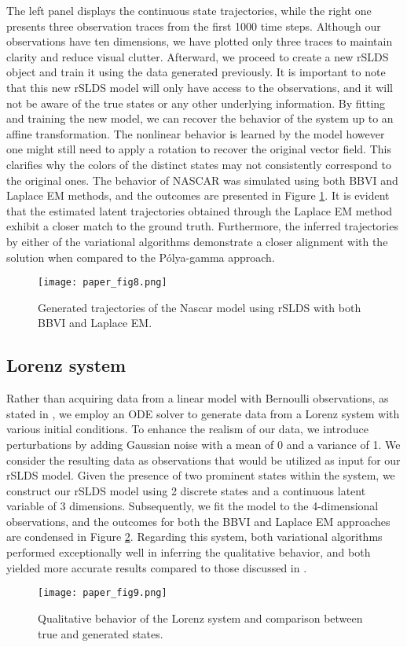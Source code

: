 The left panel displays the continuous state trajectories, while the right one presents three observation traces from the first 1000 time steps. Although our observations have ten dimensions, we have plotted only three traces to maintain clarity and reduce visual clutter. Afterward, we proceed to create a new rSLDS object and train it using the data generated previously. It is important to note that this new rSLDS model will only have access to the observations, and it will not be aware of the true states or any other underlying information. By fitting and training the new model, we can recover the behavior of the system up to an affine transformation. The nonlinear behavior is learned by the model however one might still need to apply a rotation to recover the original vector field. This clarifies why the colors of the distinct states may not consistently correspond to the original ones. The behavior of NASCAR was simulated using both BBVI and Laplace EM methods, and the outcomes are presented in Figure \ref{generatedNascar}. It is evident that the estimated latent trajectories obtained through the Laplace EM method exhibit a closer match to the ground truth. Furthermore, the inferred trajectories by either of the variational algorithms demonstrate a closer alignment with the solution when compared to the Pólya-gamma approach.
\begin{figure}[h!]
	\centering
	\texttt{[image: paper\_fig8.png]}
	\caption{Generated trajectories of the Nascar model using rSLDS with both BBVI and Laplace EM.}
	\label{generatedNascar}
\end{figure}

\subsection{Lorenz system}
Rather than acquiring data from a linear model with Bernoulli observations, as stated in \cite{linderman_bayesian_2017}, we employ an ODE solver to generate data from a Lorenz system with various initial conditions. To enhance the realism of our data, we introduce perturbations by adding Gaussian noise with a mean of 0 and a variance of 1. We consider the resulting data as observations that would be utilized as input for our rSLDS model. Given the presence of two prominent states within the system, we construct our rSLDS model using 2 discrete states and a continuous latent variable of 3 dimensions. Subsequently, we fit the model to the 4-dimensional observations, and the outcomes for both the BBVI and Laplace EM approaches are condensed in Figure \ref{lorenz}. Regarding this system, both variational algorithms performed exceptionally well in inferring the qualitative behavior, and both yielded more accurate results compared to those discussed in \cite{linderman_bayesian_2017}.
\begin{figure}[h!]
	\centering
	\texttt{[image: paper\_fig9.png]}
	\caption{Qualitative behavior of the Lorenz system and comparison between true and generated states.}
	\label{lorenz}
\end{figure}
